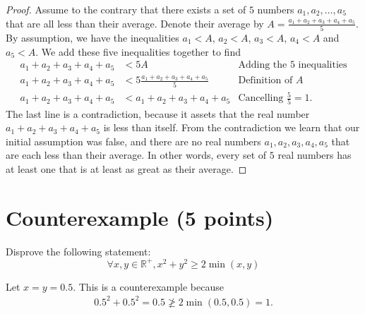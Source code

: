 \documentclass[11pt]{article}
\def\Q{\mathbb{Q}}
\def\N{\mathbb{N}}
\def\sectionOneA#1{}
\def\sectionOneB#1{}
\def\sectionTwoA#1{#1}
\def\sectionTwoB#1{}
\def\sectionVicsection#1{}
\newcounter{pgpts}
\newcounter{cumpts}
\newcommand{\cnewpage}{\addtocounter{cumpts}{\value{pgpts}}\newpage\setcounter{pgpts}{0}}
\begin{document}
\vspace{2cm}
\begin{proof}
Assume to the contrary that there exists a set of $5$ numbers $a_1,a_2,\dots,a_5$ that are all less than their average. Denote their average by $A=\frac{a_1+a_2+a_3+a_4+a_5}{5}$. By assumption, we have the inequalities $a_1<A$, $a_2<A$, $a_3<A$, $a_4<A$ and $a_5<A$. We add these five inequalities together to find
\begin{align*}
a_1+a_2+a_3+a_4+a_5 &< 5A &\text{Adding the $5$ inequalities}\\
a_1+a_2+a_3+a_4+a_5 &< 5\frac{a_1+a_2+a_3+a_4+a_5}{5} &\text{Definition of $A$}\\
a_1+a_2+a_3+a_4+a_5&<a_1+a_2+a_3+a_4+a_5 &\text{Cancelling $\frac{5}{5}=1$.}
\end{align*}
The last line is a contradiction, because it assets that the real number $a_1+a_2+a_3+a_4+a_5$ is less than itself. From the contradiction we learn that our initial assumption was false, and there are no real numbers $a_1,a_2,a_3,a_4,a_5$ that are each less than their average. In other words, every set of $5$ real numbers has at least one that is at least as great as their average.
\end{proof}

\vspace*{3cm}


\section{Counterexample (5 points)}\addtocounter{pgpts}{5}
Disprove the following statement:\\
\sectionOneA{$$\forall x,y\in \N: \frac{x+y}{x-y}\in \mathbb{Q}$$}
\sectionOneB{$$\forall x,y\in \Q^+: \sqrt{x*y}\not\in\Q^+$$} %
\sectionTwoA{$$\forall x,y\in \mathbb{R}^+, x^2+y^2\geq 2\min(x,y)$$}
\sectionTwoB{$$\forall x,y\in \Q^+: \sqrt{x*y}\not\in\Q^+$$} %
\sectionVicsection{$$ (\forall x,y \in \mathbb{Q}): x^2 + y^2 +xy \geq x+y$$}
\sectionOneA{Let $x=y=1$. Then $\frac{1+1}{1-
1}\not \in \mathbb{Q}$ because $\frac{1+1}{1-
1}$ is not well-defined due to division by $0$.}
\sectionTwoA{
Let $x=y=0.5$. This is a counterexample because 
\begin{align*}
0.5^2+0.5^2=0.5\not \geq 2\min(0.5,0.5)=1.
\end{align*}
}
\cnewpage
\end{document}
